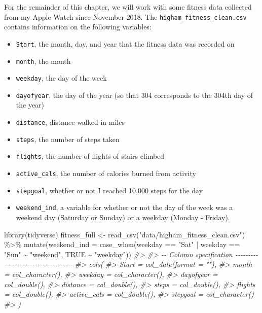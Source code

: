 \documentclass[
]{book}
\newenvironment{Shaded}{\begin{snugshade}}{\end{snugshade}}
\newcommand{\AttributeTok}[1]{\textcolor[rgb]{0.77,0.63,0.00}{#1}}
\newcommand{\CommentTok}[1]{\textcolor[rgb]{0.56,0.35,0.01}{\textit{#1}}}
\newcommand{\ConstantTok}[1]{\textcolor[rgb]{0.00,0.00,0.00}{#1}}
\newcommand{\FunctionTok}[1]{\textcolor[rgb]{0.00,0.00,0.00}{#1}}
\newcommand{\NormalTok}[1]{#1}
\newcommand{\OtherTok}[1]{\textcolor[rgb]{0.56,0.35,0.01}{#1}}
\newcommand{\SpecialCharTok}[1]{\textcolor[rgb]{0.00,0.00,0.00}{#1}}
\newcommand{\StringTok}[1]{\textcolor[rgb]{0.31,0.60,0.02}{#1}}
\providecommand{\tightlist}{%
  \setlength{\itemsep}{0pt}\setlength{\parskip}{0pt}}
\begin{document}
For the remainder of this chapter, we will work with some fitness data collected from my Apple Watch since November 2018. The \texttt{higham\_fitness\_clean.csv} contains information on the following variables:

\begin{itemize}
\tightlist
\item
  \texttt{Start}, the month, day, and year that the fitness data was recorded on
\item
  \texttt{month}, the month
\item
  \texttt{weekday}, the day of the week
\item
  \texttt{dayofyear}, the day of the year (so that 304 corresponds to the 304th day of the year)
\item
  \texttt{distance}, distance walked in miles
\item
  \texttt{steps}, the number of steps taken
\item
  \texttt{flights}, the number of flights of stairs climbed
\item
  \texttt{active\_cals}, the number of calories burned from activity
\item
  \texttt{stepgoal}, whether or not I reached 10,000 steps for the day
\item
  \texttt{weekend\_ind}, a variable for whether or not the day of the week was a weekend day (Saturday or Sunday) or a weekday (Monday - Friday).
\end{itemize}

\begin{Shaded}
\begin{Highlighting}[]
\FunctionTok{library}\NormalTok{(tidyverse)}
\NormalTok{fitness\_full }\OtherTok{\textless{}{-}} \FunctionTok{read\_csv}\NormalTok{(}\StringTok{"data/higham\_fitness\_clean.csv"}\NormalTok{) }\SpecialCharTok{\%\textgreater{}\%} \FunctionTok{mutate}\NormalTok{(}\AttributeTok{weekend\_ind =} \FunctionTok{case\_when}\NormalTok{(weekday }\SpecialCharTok{==} \StringTok{"Sat"} \SpecialCharTok{|}\NormalTok{ weekday }\SpecialCharTok{==} \StringTok{"Sun"} \SpecialCharTok{\textasciitilde{}} \StringTok{"weekend"}\NormalTok{,}
  \ConstantTok{TRUE} \SpecialCharTok{\textasciitilde{}} \StringTok{"weekday"}\NormalTok{))}
\CommentTok{\#\textgreater{} }
\CommentTok{\#\textgreater{} {-}{-} Column specification {-}{-}{-}{-}{-}{-}{-}{-}{-}{-}{-}{-}{-}{-}{-}{-}{-}{-}{-}{-}{-}{-}{-}{-}{-}{-}{-}{-}{-}{-}{-}{-}{-}{-}{-}{-}}
\CommentTok{\#\textgreater{} cols(}
\CommentTok{\#\textgreater{}   Start = col\_date(format = ""),}
\CommentTok{\#\textgreater{}   month = col\_character(),}
\CommentTok{\#\textgreater{}   weekday = col\_character(),}
\CommentTok{\#\textgreater{}   dayofyear = col\_double(),}
\CommentTok{\#\textgreater{}   distance = col\_double(),}
\CommentTok{\#\textgreater{}   steps = col\_double(),}
\CommentTok{\#\textgreater{}   flights = col\_double(),}
\CommentTok{\#\textgreater{}   active\_cals = col\_double(),}
\CommentTok{\#\textgreater{}   stepgoal = col\_character()}
\CommentTok{\#\textgreater{} )}
\end{Highlighting}
\end{Shaded}
\end{document}
